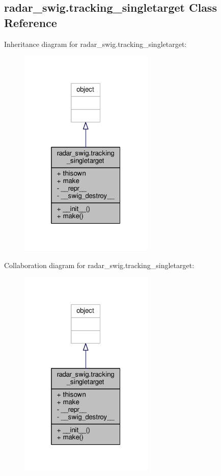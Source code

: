 \subsection{radar\+\_\+swig.\+tracking\+\_\+singletarget Class Reference}
\label{classradar__swig_1_1tracking__singletarget}


Inheritance diagram for radar\+\_\+swig.\+tracking\+\_\+singletarget\+:
\nopagebreak
\begin{figure}[H]
\begin{center}
\leavevmode
\includegraphics[width=181pt]{dc/d62/classradar__swig_1_1tracking__singletarget__inherit__graph}
\end{center}
\end{figure}


Collaboration diagram for radar\+\_\+swig.\+tracking\+\_\+singletarget\+:
\nopagebreak
\begin{figure}[H]
\begin{center}
\leavevmode
\includegraphics[width=181pt]{d9/dd2/classradar__swig_1_1tracking__singletarget__coll__graph}
\end{center}
\end{figure}
